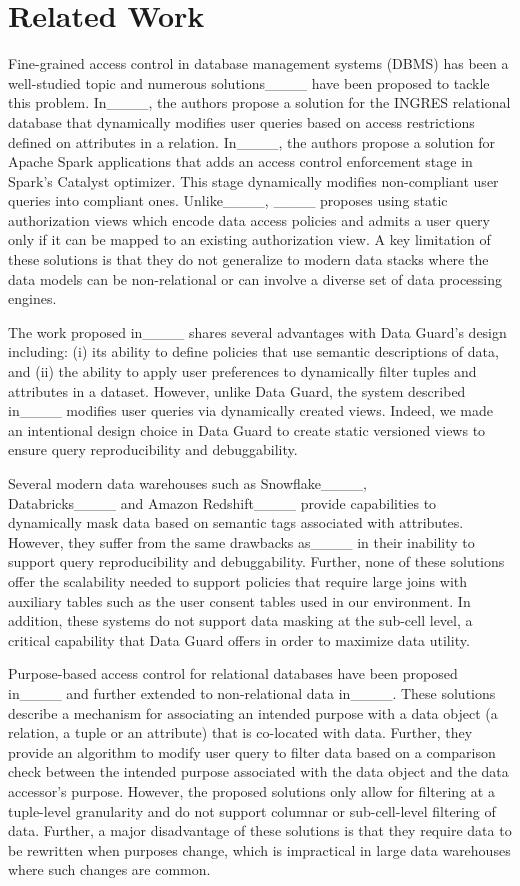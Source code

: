 \section{Related Work}
Fine-grained access control in database management systems (DBMS) has been a well-studied topic and numerous solutions____ have been proposed to tackle this problem. In____, the authors propose a solution for the INGRES relational database that dynamically modifies user queries based on access restrictions defined on attributes in a relation. In____, the authors propose a solution for Apache Spark applications that adds an access control enforcement stage in Spark's Catalyst optimizer. This stage dynamically modifies non-compliant user queries into compliant ones. Unlike____, ____ proposes using static authorization views which encode data access policies and admits a user query only if it can be mapped to an existing authorization view. A key limitation of these solutions is that they do not generalize to modern data stacks where the data models can be non-relational or can involve a diverse set of data processing engines. 

The work proposed in____ shares several advantages with Data Guard's design including: (i) its ability to define policies that use semantic descriptions of data, and 
(ii) the ability to apply user preferences to dynamically filter tuples and attributes in a dataset. However, unlike Data Guard, the system described in____  modifies user queries via dynamically created views. Indeed, we made an intentional design choice in Data Guard to create static versioned views to ensure query reproducibility and debuggability. 

Several modern data warehouses such as Snowflake____, \\ Databricks____ and Amazon Redshift____ provide capabilities to dynamically mask data based on semantic tags associated with attributes. However, they suffer from the same drawbacks as____ in their inability to support query reproducibility and debuggability. Further, none of these solutions offer the scalability needed to support policies that require large joins with auxiliary tables such as the user consent tables used in our environment. In addition, these systems do not support data masking at the sub-cell level, a critical capability that Data Guard offers in order to maximize data utility.

Purpose-based access control for relational databases have been proposed in____ and further extended to non-relational data in____. These solutions describe a mechanism for associating an intended purpose with a data object (a relation, a tuple or an attribute) that is co-located with data. Further, they provide an algorithm to modify user query to filter data based on a comparison check between the intended purpose associated with the data object and the data accessor's purpose. However, the proposed solutions only allow for filtering at a tuple-level granularity and do not support columnar or sub-cell-level filtering of data. Further, a major disadvantage of these solutions is that they require data to be rewritten when purposes change, which is impractical in large data warehouses where such changes are common. 

